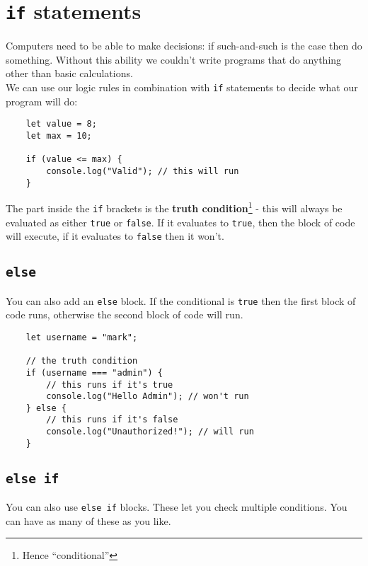 \section{\texttt{if} statements}

Computers need to be able to make decisions: if such-and-such is the case then do something. Without this ability we couldn't write programs that do anything other than basic calculations.
\\

We can use our logic rules in combination with \texttt{if} statements to decide what our program will do:


\begin{verbatim}
    let value = 8;
    let max = 10;

    if (value <= max) {
        console.log("Valid"); // this will run
    }
\end{verbatim}

The part inside the \texttt{if} brackets is the \textbf{truth condition}\footnote{Hence ``conditional''} - this will always be evaluated as either \texttt{true} or \texttt{false}. If it evaluates to \texttt{true}, then the block of code will execute, if it evaluates to \texttt{false} then it won't.


\subsection{\texttt{else}}

You can also add an \texttt{else} block. If the conditional is \texttt{true} then the first block of code runs, otherwise the second block of code will run.

\begin{verbatim}
    let username = "mark";

    // the truth condition
    if (username === "admin") {
        // this runs if it's true
        console.log("Hello Admin"); // won't run
    } else {
        // this runs if it's false
        console.log("Unauthorized!"); // will run
    }
\end{verbatim}


\subsection{\texttt{else if}}

You can also use \texttt{else if} blocks. These let you check multiple conditions. You can have as many of these as you like.
\\

